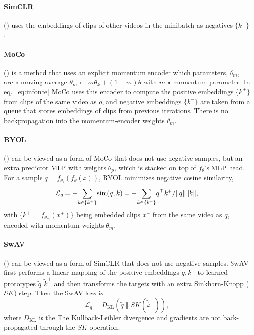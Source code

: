 \documentclass[final]{cvpr}
\begin{document}
	
	\paragraph{SimCLR} \cite{Chen20} () uses the embeddings of clips of other videos in the minibatch as negatives $\{k^{-}\}$.
	
	\paragraph{MoCo} \cite{He20} () is a method that uses an explicit momentum encoder which parameters, $\theta_m$, are a moving average \mbox{$\theta_m \leftarrow m \theta_k + (1 - m) \theta$} with $m$ a momentum parameter. In eq.~\eqref{eq:infonce} MoCo uses this encoder to compute the positive embeddings $\{k^{+}\}$ from clips of the same video as $q$, and negative embeddings $\{k^{-}\}$ are taken from a queue that stores embeddings of clips from previous iterations. There is no backpropagation into the momentum-encoder weights $\theta_m$.
	
	\paragraph{BYOL} \cite{Grill2020} () can be viewed as a form of MoCo that does not use negative samples, but an extra predictor MLP with weights $\theta_p$, which is stacked on top of $f_\theta$'s MLP head. For a sample $q = f_{\theta_p}(f_\theta(x))$, BYOL minimizes negative cosine similarity,
	\begin{equation}\label{eq:byol} 	\small
				\mathcal{L}_{q} = - {\sum_{k \in \{k^+\}}}  \mathrm{sim}(q, k) = - {\sum_{k \in \{k^+\}}}  q^\top k^+ / \lVert q\rVert \lVert  k\rVert,
	\end{equation}
	with $\{k^{+}\ {=} f_{\theta_m}(x^+) \}$ being embedded clips $x^+$ from the same video as $q$, encoded with momentum weights $\theta_m$.
	
	
	\paragraph{SwAV}  \cite{Caron20} () can be viewed as a form of SimCLR that does not use negative samples. SwAV first performs a linear mapping of the positive embeddings $q,k^+$ to learned prototypes $\tilde{q},\tilde{k}^+$ and then transforms the targets with an extra Sinkhorn-Knopp ($SK$) step. Then the SwAV loss is
	\begin{equation}
		\mathcal{L}_{q} =   D_\text{KL}(  \tilde{q} \| SK(\tilde{k}^+) ),
		\label{eq:swav}
	\end{equation}
	where $D_\text{KL}$ is the The Kullback-Leibler divergence and gradients are not back-propagated through the $SK$ operation. 
	
\end{document}
